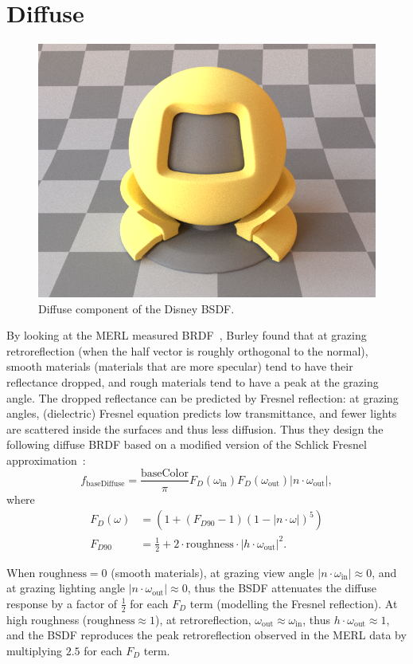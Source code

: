 \section{Diffuse}
\begin{figure}
	\centering
	\includegraphics[width=0.5\linewidth]{imgs/disney_diffuse.png}
	\caption{Diffuse component of the Disney BSDF.}
\end{figure}

By looking at the MERL measured BRDF~\cite{Matusik:2003:DRM}, Burley found that at grazing retroreflection (when the half vector is roughly orthogonal to the normal), smooth materials (materials that are more specular) tend to have their reflectance dropped, and rough materials tend to have a peak at the grazing angle. The dropped reflectance can be predicted by Fresnel reflection: at grazing angles, (dielectric) Fresnel equation predicts low transmittance, and fewer lights are scattered inside the surfaces and thus less diffusion. Thus they design the following diffuse BRDF based on a modified version of the Schlick Fresnel approximation~\cite{Schlick:1994:IBM}:
\begin{equation}
	f_{\text{baseDiffuse}} = \frac{\text{baseColor}}{\pi}
	F_D(\omega_{\text{in}}) F_D(\omega_{\text{out}}) |n \cdot \omega_{\text{out}}|,
\end{equation}
where
\begin{equation}
\begin{aligned}
F_D(\omega) &= \left(1 + (F_{D90} - 1) (1 - |n \cdot \omega|)^5 \right) \\
F_{D90} &= \frac{1}{2} + 2 \cdot \text{roughness} \cdot |h \cdot \omega_{\text{out}}|^2.
\end{aligned}
\end{equation}

When $\text{roughness} = 0$ (smooth materials), at grazing view angle $|n \cdot \omega_{\text{in}}| \approx 0$, and at grazing lighting angle $|n \cdot \omega_{\text{out}}| \approx 0$, thus the BSDF attenuates the diffuse response by a factor of $\frac{1}{2}$ for each $F_D$ term (modelling the Fresnel reflection). At high roughness ($\text{roughness} \approx 1$), at retroreflection, $\omega_{\text{out}} \approx \omega_{\text{in}}$, thus $h \cdot \omega_{\text{out}} \approx 1$, and the BSDF reproduces the peak retroreflection observed in the MERL data by multiplying $2.5$ for each $F_D$ term.

